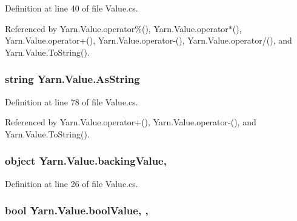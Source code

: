 Definition at line 40 of file Value.\-cs.



Referenced by Yarn.\-Value.\-operator\%(), Yarn.\-Value.\-operator$\ast$(), Yarn.\-Value.\-operator+(), Yarn.\-Value.\-operator-\/(), Yarn.\-Value.\-operator/(), and Yarn.\-Value.\-To\-String().

\hypertarget{a00177_a2d5d0ec41c50c642c1d0eeeb6bb2b1c0}{
\subsubsection[{As\-String}]{\setlength{\rightskip}{0pt plus 5cm}string Yarn.\-Value.\-As\-String\hspace{0.3cm}{\ttfamily [get]}}}\label{a00177_a2d5d0ec41c50c642c1d0eeeb6bb2b1c0}


Definition at line 78 of file Value.\-cs.



Referenced by Yarn.\-Value.\-operator+(), Yarn.\-Value.\-operator-\/(), and Yarn.\-Value.\-To\-String().

\hypertarget{a00177_a051dd30c6cb184f1fe941a95be8781ab}{
\subsubsection[{backing\-Value}]{\setlength{\rightskip}{0pt plus 5cm}object Yarn.\-Value.\-backing\-Value\hspace{0.3cm}{\ttfamily [get]}, {\ttfamily [private]}}}\label{a00177_a051dd30c6cb184f1fe941a95be8781ab}


Definition at line 26 of file Value.\-cs.

\hypertarget{a00177_acb140e3466e132528409d4c441fd67da}{
\subsubsection[{bool\-Value}]{\setlength{\rightskip}{0pt plus 5cm}bool Yarn.\-Value.\-bool\-Value\hspace{0.3cm}{\ttfamily [get]}, {\ttfamily [set]}, {\ttfamily [package]}}}\label{a00177_acb140e3466e132528409d4c441fd67da}


